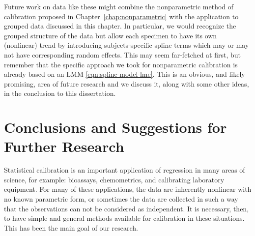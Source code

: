 \documentclass[cmfont,usenames,dvipsnames,leqno]{afit-etd}\usepackage[]{graphicx}\usepackage[]{color}
\begin{document}

Future work on data like these might combine the nonparametric method of calibration proposed in Chapter~\ref{chap:nonparametric} with the application to grouped data discussed in this chapter. In particular, we would recognize the grouped structure of the data but allow each specimen to have its own (nonlinear) trend by introducing subjects-specific spline terms which may or may not have corresponding random effects. This may seem far-fetched at first, but remember that the specific approach we took for nonparametric calibration is already based on an \ac{LMM} \eqref{eqn:spline-model-lme}. This is an obvious, and likely promising, area of future research and we discuss it, along with some other ideas, in the conclusion to this dissertation.





\chapter{Conclusions and Suggestions for Further Research}
\label{chp:conclusion}
Statistical calibration is an important application of regression in many areas of science, for example: bioassays, chemometrics, and calibrating laboratory equipment. For many of these applications, the data are inherently nonlinear with no known parametric form, or sometimes the data are collected in such a way that the observations can not be considered as independent. It is necessary, then, to have simple and general methods available for calibration in these situations. This has been the main goal of our research.
\end{document}
